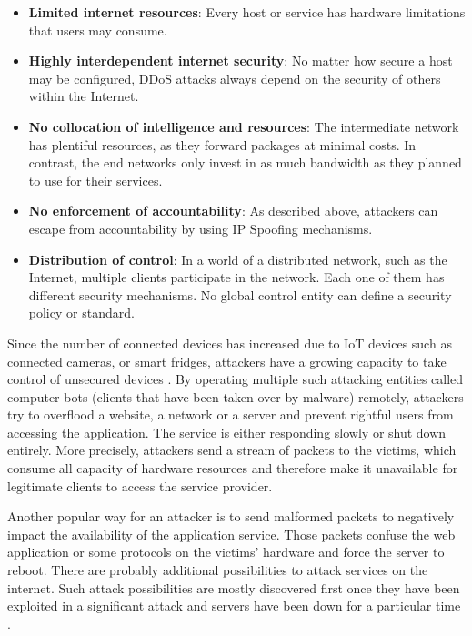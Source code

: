 \begin{itemize}
  \item \textbf{Limited internet resources}: Every host or service has hardware limitations that users may consume.
  \item \textbf{Highly interdependent internet security}: No matter how secure a host may be configured, DDoS attacks always depend on the security of others within the Internet.
  \item \textbf{No collocation of intelligence and resources}: The intermediate network has plentiful resources, as they forward packages at minimal costs.  In contrast, the end networks only invest in as much bandwidth as they planned to use for their services.
  \item \textbf{No enforcement of accountability}: As described above, attackers can escape from accountability by using IP Spoofing mechanisms.
  \item \textbf{Distribution of control}: In a world of a distributed network, such as the Internet, multiple clients participate in the network. Each one of them has different security mechanisms. No global control entity can define a security policy or standard.
\end{itemize}
Since the number of connected devices has increased due to IoT devices such as connected cameras, or smart fridges, attackers have a growing capacity to take control of unsecured devices \cite{Rodrigues2017}. By operating multiple such attacking entities called computer bots (clients that have been taken over by malware) remotely, attackers try to overflood a website, a network or a server and prevent rightful users from accessing the application. The service is either responding slowly or shut down entirely. More precisely, attackers send a stream of packets to the victims, which consume all capacity of hardware resources and therefore make it unavailable for legitimate clients to access the service provider.

Another popular way for an attacker is to send malformed packets to negatively impact the availability of the application service. Those packets confuse the web application or some protocols on the victims' hardware and force the server to reboot. There are probably additional possibilities to attack services on the internet. Such attack possibilities are mostly discovered first once they have been exploited in a significant attack and servers have been down for a particular time \cite{Mirkovic2004}.

